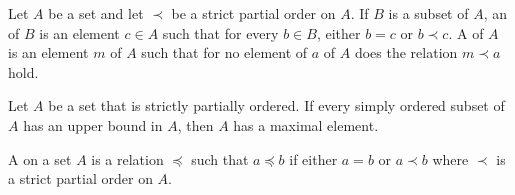     \begin{definition}
        Let $A$ be a set and let $\prec$ be a strict partial order on $A$. If $B$ is a subset of $A$, an  of $B$ is an element $c \in A$ such that for every $b \in B$, either $b = c$ or $b \prec c$. A  of $A$ is an element $m$ of $A$ such that for no element of $a$ of $A$ does the relation $m \prec a$ hold.
    \end{definition}

    \begin{lemma}
        Let $A$ be a set that is strictly partially ordered. If every simply ordered subset of $A$ has an upper bound in $A$, then $A$ has a maximal element.
    \end{lemma}

    \begin{remark}
        A  on a set $A$ is a relation $\preceq$ such that $a \preceq b$ if either $a = b$ or $a \prec b$ where $\prec$ is a strict partial order on $A$.
    \end{remark}



